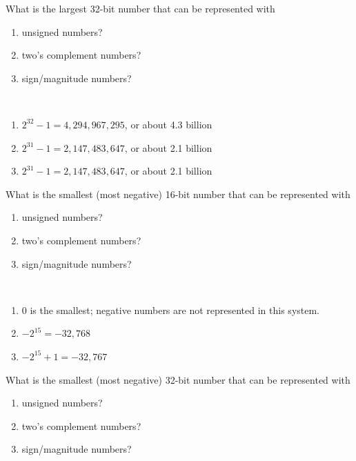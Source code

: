\documentclass[12pt]{article}
\newenvironment{ex}[2][Exercise]{\begin{trivlist}
		\item[\hskip \labelsep {\bfseries #1}\hskip \labelsep {\bfseries #2.}]}{\end{trivlist}}
\newenvironment{sol}[1][Solution]{\begin{trivlist}
		\item[\hskip \labelsep {\bfseries #1:}]}{\end{trivlist}}
\begin{document}
\begin{ex}{1.10}
	What is the largest 32-bit number that can be represented with
	\begin{enumerate}[label=(\alph*)]
		\item unsigned numbers?
		\item two's complement numbers?
		\item sign/magnitude numbers?
	\end{enumerate}
\end{ex}

\begin{sol}\
	\begin{enumerate}[label=(\alph*)]
		\item $2^{32}-1=4,294,967,295$, or about 4.3 billion
		\item $2^{31}-1=2,147,483,647$, or about 2.1 billion
		\item $2^{31}-1=2,147,483,647$, or about 2.1 billion
	\end{enumerate}
\end{sol}

\begin{ex}{1.11}
	What is the smallest (most negative) 16-bit number that can be represented with
	\begin{enumerate}[label=(\alph*)]
		\item unsigned numbers?
		\item two's complement numbers?
		\item sign/magnitude numbers?
	\end{enumerate}
\end{ex}

\begin{sol}\
	\begin{enumerate}[label=(\alph*)]
		\item 0 is the smallest; negative numbers are not represented in this system.
		\item $-2^{15}=-32,768$
		\item $-2^{15}+1=-32,767$
	\end{enumerate}
\end{sol}

\begin{ex}{1.12}
	What is the smallest (most negative) 32-bit number that can be represented with
	\begin{enumerate}[label=(\alph*)]
		\item unsigned numbers?
		\item two's complement numbers?
		\item sign/magnitude numbers?
	\end{enumerate}
\end{ex}
\end{document}
